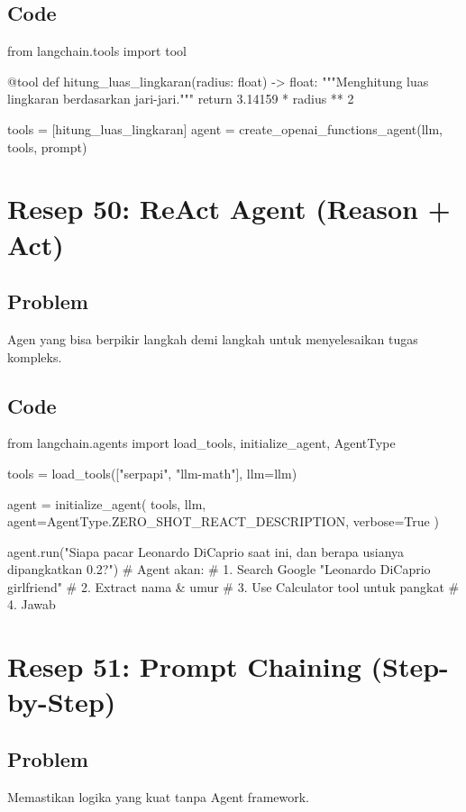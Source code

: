 \subsection*{Code}
\begin{codeblock}[language=Python]
from langchain.tools import tool

@tool
def hitung_luas_lingkaran(radius: float) -> float:
    """Menghitung luas lingkaran berdasarkan jari-jari."""
    return 3.14159 * radius ** 2

tools = [hitung_luas_lingkaran]
agent = create_openai_functions_agent(llm, tools, prompt)
\end{codeblock}

\newpage

\section{Resep 50: ReAct Agent (Reason + Act)}

\subsection*{Problem}
Agen yang bisa berpikir langkah demi langkah untuk menyelesaikan tugas kompleks.

\subsection*{Code}
\begin{codeblock}[language=Python]
from langchain.agents import load_tools, initialize_agent, AgentType

tools = load_tools(["serpapi", "llm-math"], llm=llm)

agent = initialize_agent(
    tools,
    llm,
    agent=AgentType.ZERO_SHOT_REACT_DESCRIPTION,
    verbose=True
)

agent.run("Siapa pacar Leonardo DiCaprio saat ini, dan berapa usianya dipangkatkan 0.2?")
# Agent akan:
# 1. Search Google "Leonardo DiCaprio girlfriend"
# 2. Extract nama & umur
# 3. Use Calculator tool untuk pangkat
# 4. Jawab
\end{codeblock}

\newpage

\section{Resep 51: Prompt Chaining (Step-by-Step)}

\subsection*{Problem}
Memastikan logika yang kuat tanpa Agent framework.

